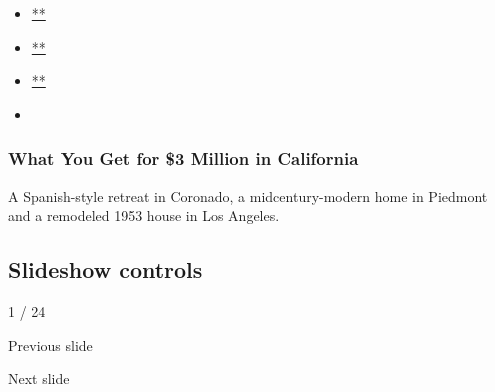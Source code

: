 \begin{itemize}
\item
  \href{https://www.facebookcorewwwi.onion/sharer.php?app_id=9869919170\&u=https\%3A\%2F\%2Fwww.nytimes3xbfgragh.onion\%2Fslideshow\%2F2020\%2F08\%2F03\%2Frealestate\%2Fwhat-you-get-for-3-million-in-california.html\%3Fsmid\%3Dfb-share\&name=What\%20You\%20Get\%20for\%20\%243\%20Million\%20in\%20California\&redirect_uri=https\%3A\%2F\%2Fwww.facebookcorewwwi.onion\%2F}{**}
\item
  \href{https://twitter.com/intent/tweet?url=https\%3A\%2F\%2Fwww.nytimes3xbfgragh.onion\%2Fslideshow\%2F2020\%2F08\%2F03\%2Frealestate\%2Fwhat-you-get-for-3-million-in-california.html\%3Fsmid\%3Dtw-share\&text=What\%20You\%20Get\%20for\%20\%243\%20Million\%20in\%20California}{**}
\item
  \href{mailto:?subject=nytimes3xbfgragh.onion\%3A\%20What\%20You\%20Get\%20for\%20\%243\%20Million\%20in\%20California\&body=From\%20The\%20New\%20York\%20Times\%3A\%0A\%0AWhat\%20You\%20Get\%20for\%20\%243\%20Million\%20in\%20California\%0A\%0AA\%20Spanish-style\%20retreat\%20in\%20Coronado\%2C\%20a\%20midcentury-modern\%20home\%20in\%20Piedmont\%20and\%20a\%20remodeled\%201953\%20house\%20in\%20Los\%20Angeles.\%0A\%0Ahttps\%3A\%2F\%2Fwww.nytimes3xbfgragh.onion\%2Fslideshow\%2F2020\%2F08\%2F03\%2Frealestate\%2Fwhat-you-get-for-3-million-in-california.html\%3Fsmid\%3Dem-share}{**}
\item
\end{itemize}

\hypertarget{what-you-get-for-3-million-in-california-1}{%
\subsubsection{What You Get for \$3 Million in
California}\label{what-you-get-for-3-million-in-california-1}}

A Spanish-style retreat in Coronado, a midcentury-modern home in
Piedmont and a remodeled 1953 house in Los Angeles.

\hypertarget{slideshow-controls}{%
\subsection{Slideshow controls}\label{slideshow-controls}}

1 / 24

Previous slide

Next slide
